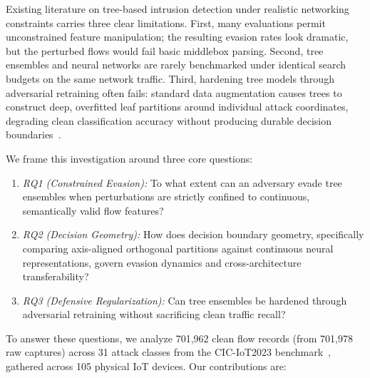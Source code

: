 \documentclass[iicol,pdflatex,sn-mathphys-num]{sn-jnl}
\begin{document}
Existing literature on tree-based intrusion detection under realistic networking constraints carries three clear limitations. First, many evaluations permit unconstrained feature manipulation; the resulting evasion rates look dramatic, but the perturbed flows would fail basic middlebox parsing. Second, tree ensembles and neural networks are rarely benchmarked under identical search budgets on the same network traffic. Third, hardening tree models through adversarial retraining often fails: standard data augmentation causes trees to construct deep, overfitted leaf partitions around individual attack coordinates, degrading clean classification accuracy without producing durable decision boundaries~\cite{tramer2020adaptive}.

We frame this investigation around three core questions:
\begin{enumerate}
    \item \textit{RQ1 (Constrained Evasion):} To what extent can an adversary evade tree ensembles when perturbations are strictly confined to continuous, semantically valid flow features?
    \item \textit{RQ2 (Decision Geometry):} How does decision boundary geometry, specifically comparing axis-aligned orthogonal partitions against continuous neural representations, govern evasion dynamics and cross-architecture transferability?
    \item \textit{RQ3 (Defensive Regularization):} Can tree ensembles be hardened through adversarial retraining without sacrificing clean traffic recall?
\end{enumerate}

To answer these questions, we analyze 701,962 clean flow records (from 701,978 raw captures) across 31 attack classes from the CIC-IoT2023 benchmark~\cite{neto2023ciciot2023}, gathered across 105 physical IoT devices. Our contributions are:
\end{document}
